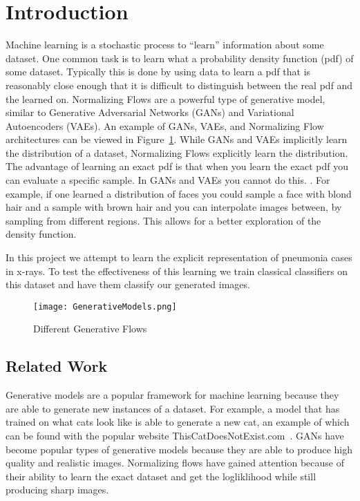 \section{Introduction} 
Machine learning is a stochastic process to ``learn'' information about some
dataset. One common task is to learn what a probability density function (pdf) 
of some dataset. Typically this is done by using data to learn a pdf that is
reasonably close enough that it is difficult to distinguish between the real pdf
and the learned on.
Normalizing Flows are a powerful type of generative
model, similar to Generative Adversarial Networks (GANs) and Variational
Autoencoders (VAEs). An example of GANs, VAEs, and Normalizing Flow
architectures can be viewed in Figure~\ref{fig:gens}. While GANs and VAEs
implicitly learn the distribution of a dataset, Normalizing Flows explicitly
learn the distribution. The advantage of learning an exact pdf is that when
you learn the exact pdf you can evaluate a specific sample. In GANs and VAEs you
cannot do this.  . For example, if one learned a distribution of faces you could
sample a face with blond hair and a sample with brown hair and you can
interpolate images between, by sampling from different regions. This allows for
a better exploration of the density function.

In this project we attempt to learn the explicit
representation of pneumonia cases in x-rays. To test the effectiveness of this
learning we train classical classifiers on this dataset and have them classify
our generated images.

\begin{figure}[ht]
\center\texttt{[image: GenerativeModels.png]}
\caption{Different Generative Flows~\cite{weng2018flow}}
\label{fig:gens}
\end{figure}

\subsection{Related Work}
Generative models are a popular framework for machine learning because they are
able to generate new instances of a dataset. For example, a model that has
trained on what cats look like is able to generate a new cat, an example of
which can be found with the popular website
ThisCatDoesNotExist.com~\cite{tcdne}. GANs have become popular types of
generative models because they are able to produce high quality and realistic
images. Normalizing flows have gained attention because of their ability to
learn the exact dataset and get the logliklihood while still producing sharp
images. 

